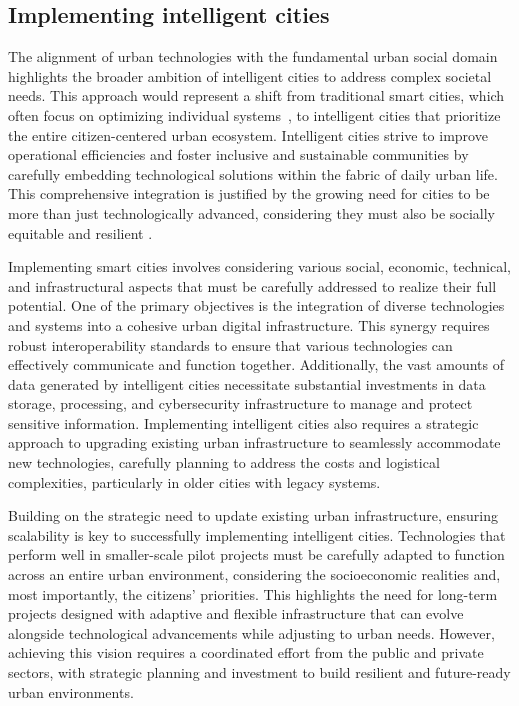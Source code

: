 \documentclass[smartcities,article,submit,pdftex,moreauthors]{Definitions/mdpi}
\begin{document}
\subsection{Implementing intelligent cities} 

The alignment of urban technologies with the fundamental urban social domain highlights the broader ambition of intelligent cities to address complex societal needs. This approach would represent a shift from traditional smart cities, which often focus on optimizing individual systems~\cite{javedFutureSmartCities2022,ketuContemporarySurveyIoT2022}, to intelligent cities that prioritize the entire citizen-centered urban ecosystem. Intelligent cities strive to improve operational efficiencies and foster inclusive and sustainable communities by carefully embedding technological solutions within the fabric of daily urban life. This comprehensive integration is justified by the growing need for cities to be more than just technologically advanced, considering they must also be socially equitable and resilient \cite{samarakkodyResilientSmartCities2022,toliInequalitySustainabilitySmartCity2020}. 

Implementing smart cities involves considering various social, economic, technical, and infrastructural aspects that must be carefully addressed to realize their full potential. One of the primary objectives is the integration of diverse technologies and systems into a cohesive urban digital infrastructure. This synergy requires robust interoperability standards to ensure that various technologies can effectively communicate and function together. Additionally, the vast amounts of data generated by intelligent cities necessitate substantial investments in data storage, processing, and cybersecurity infrastructure to manage and protect sensitive information. Implementing intelligent cities also requires a strategic approach to upgrading existing urban infrastructure to seamlessly accommodate new technologies, carefully planning to address the costs and logistical complexities, particularly in older cities with legacy systems.

Building on the strategic need to update existing urban infrastructure, ensuring scalability is key to successfully implementing intelligent cities. Technologies that perform well in smaller-scale pilot projects must be carefully adapted to function across an entire urban environment, considering the socioeconomic realities and, most importantly, the citizens' priorities. This highlights the need for long-term projects designed with adaptive and flexible infrastructure that can evolve alongside technological advancements while adjusting to urban needs.
However, achieving this vision requires a coordinated effort from the public and private sectors, with strategic planning and investment to build resilient and future-ready urban environments.
\end{document}
